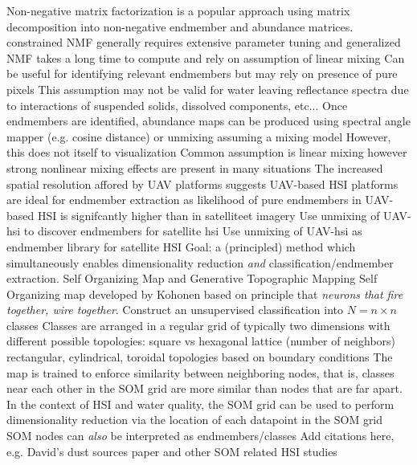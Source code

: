 \documentclass{article}
\begin{document}
\begin{outline}[enumerate]
            \4 Non-negative matrix factorization is a popular approach using matrix decomposition into non-negative endmember and abundance matrices. constrained NMF generally requires extensive parameter tuning and generalized NMF takes a long time to compute and rely on assumption of linear mixing \cite{Feng2022HyperspectralUB}
        \3 Can be useful for identifying relevant endmembers but may rely on presence of pure pixels
            \4 This assumption may not be valid for water leaving reflectance spectra due to interactions of suspended solids, dissolved components, etc...
        \3 Once endmembers are identified, abundance maps can be produced using spectral angle mapper (e.g. cosine distance) or unmixing assuming a mixing model
            \4 However, this does not itself to visualization
            \4 Common assumption is linear mixing however strong nonlinear mixing effects are present in many situations \cite{heylen2014review}
        \3 The increased spatial resolution affored by UAV platforms suggests UAV-based HSI platforms are ideal for endmember extraction as likelihood of pure endmembers in UAV-based HSI is signifcantly higher than in satelliteet imagery
            \4 Use unmixing of UAV-hsi to discover endmembers for satellite hsi \cite{alvarez2020can}
            \4 Use unmixing of UAV-hsi as endmember library for satellite HSI \cite{gu2023intrinsic}
    \2 Goal: a (principled) method which simultaneously enables dimensionality reduction \textit{and} classification/endmember extraction.
\1 Self Organizing Map and Generative Topographic Mapping
    \2 Self Organizing map developed by Kohonen based on principle that \textit{neurons that fire together, wire together}. \cite{kohonen-som-1}
        \3 Construct an unsupervised classification into $N=n\times n$ classes
        \3 Classes are arranged in a regular grid of typically two dimensions with different possible topologies:
            \4 square vs hexagonal lattice (number of neighbors)
            \4 rectangular, cylindrical, toroidal topologies based on boundary conditions
        \3 The map is trained to enforce similarity between neighboring nodes, that is, classes near each other in the SOM grid are more similar than nodes that are far apart. 
        \3 In the context of HSI and water quality, the SOM grid can be used to perform dimensionality reduction via the location of each datapoint in the SOM grid 
        \3 SOM nodes can \textit{also} be interpreted as endmembers/classes
            \4 Add citations here, e.g. David's dust sources paper and other SOM related HSI studies

\end{outline}
\end{document}
